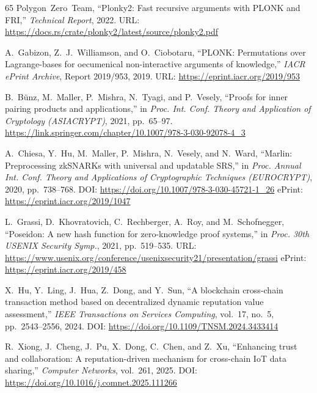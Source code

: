 \documentclass[journal]{IEEEtran}
\begin{document}
\begin{thebibliography}{65}
Polygon~Zero~Team,
``Plonky2: Fast recursive arguments with PLONK and FRI,''
\textit{Technical Report}, 2022.
\newblock URL: \url{https://docs.rs/crate/plonky2/latest/source/plonky2.pdf}

A.~Gabizon, Z.~J.~Williamson, and O.~Ciobotaru,
``PLONK: Permutations over Lagrange-bases for oecumenical non-interactive
arguments of knowledge,''
\textit{IACR ePrint Archive}, Report 2019/953, 2019.
\newblock URL: \url{https://eprint.iacr.org/2019/953}

B.~B\"unz, M.~Maller, P.~Mishra, N.~Tyagi, and P.~Vesely,
``Proofs for inner pairing products and applications,''
in \textit{Proc. Int. Conf. Theory and Application of Cryptology
(ASIACRYPT)}, 2021, pp.~65--97.
\newblock  \url{https://link.springer.com/chapter/10.1007/978-3-030-92078-4_3}

A.~Chiesa, Y.~Hu, M.~Maller, P.~Mishra, N.~Vesely, and N.~Ward,
``Marlin: Preprocessing zkSNARKs with universal and updatable SRS,''
in \textit{Proc. Annual Int. Conf. Theory and Applications of Cryptographic
Techniques (EUROCRYPT)}, 2020, pp.~738--768.
\newblock DOI: \url{https://doi.org/10.1007/978-3-030-45721-1_26}
\newblock ePrint: \url{https://eprint.iacr.org/2019/1047}

L.~Grassi, D.~Khovratovich, C.~Rechberger, A.~Roy, and M.~Schofnegger,
``Poseidon: A new hash function for zero-knowledge proof systems,''
in \textit{Proc. 30th USENIX Security Symp.}, 2021, pp.~519--535.
\newblock URL: \url{https://www.usenix.org/conference/usenixsecurity21/presentation/grassi}
\newblock ePrint: \url{https://eprint.iacr.org/2019/458}


X.~Hu, Y.~Ling, J.~Hua, Z.~Dong, and Y.~Sun,
``A blockchain cross-chain transaction method based on decentralized dynamic
reputation value assessment,''
\textit{IEEE Transactions on Services Computing}, vol.~17, no.~5,
pp.~2543--2556, 2024.
\newblock DOI: \url{https://doi.org/10.1109/TNSM.2024.3433414}

R.~Xiong, J.~Cheng, J.~Pu, X.~Dong, C.~Chen, and Z.~Xu,
``Enhancing trust and collaboration: A reputation-driven mechanism for
cross-chain IoT data sharing,''
\textit{Computer Networks}, vol.~261, 2025.
\newblock DOI: \url{https://doi.org/10.1016/j.comnet.2025.111266}


\end{thebibliography}
\end{document}
